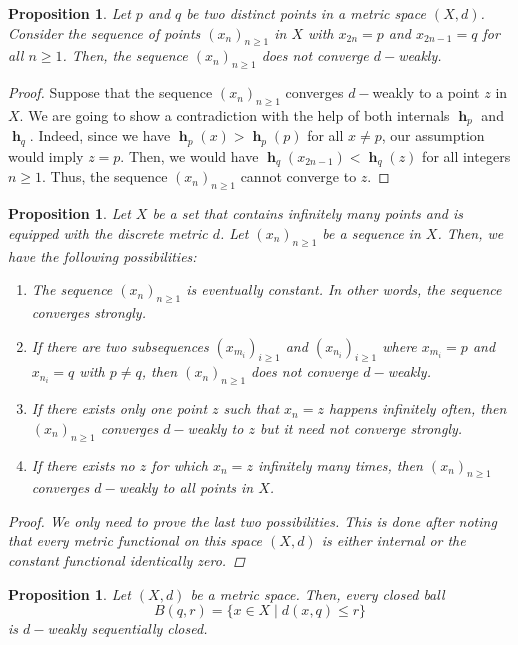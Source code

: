 \documentclass[a4paper,12pt]{article}
\newtheorem{prop}[thm]{Proposition}
\theoremstyle{definition}
\DeclareMathOperator{\h}{\mathbf{h}}
\numberwithin{equation}{section}
\begin{document}
\begin{prop}   
Let $p$ and $q$ be two distinct points in a metric space $(X,d)$. Consider the 
sequence of points $(x_n)_{n\geq 1}$ in $X$ with $x_{2n}=p$ and $x_{2n-1} = q$ 
for all $n\geq 1$. Then, the sequence $(x_n)_{n\geq 1}$ does not converge 
$d-$weakly.
\end{prop}
 
\begin{proof}  
Suppose that the sequence $(x_n)_{n\geq 1}$ converges $d-$weakly to a point $z$ 
in $X$. We are going to show a contradiction with the help of both internals 
$\h_p$ and $\h_q$. Indeed, since we have $\h_p(x) > \h_p(p)$ for all $x\neq p$, 
our assumption would imply $z = p$. Then, we would have $\h_q(x_{2n-1}) < \h_q(z)$ 
for all integers $n\geq 1$. Thus, the sequence $(x_n)_{n\geq 1}$ cannot converge 
to $z$.
\end{proof}
  
\begin{prop}
Let $X$ be a set that contains infinitely many points and is equipped with the 
discrete metric $d$. Let $(x_n)_{n\geq 1}$ be a sequence in $X$. Then, we have 
the following possibilities:
\begin{enumerate}
    \item The sequence $(x_n)_{n\geq 1}$ is eventually constant. In other words, 
    the sequence converges strongly.
    \item If there are two subsequences $(x_{m_i})_{i\geq 1}$ and 
    $(x_{n_i})_{i\geq 1}$ where $x_{m_i}=p$ and $x_{n_i}=q$ 
    with $p \not=q$, then $(x_n)_{n\geq 1}$ does not converge $d-$weakly.
    \item If there exists only one point $z$ such that $x_n=z$ 
    happens infinitely often, then $(x_n)_{n \geq 1}$ converges $d-$weakly 
    to $z$ but it need not converge strongly.
    \item If there exists no $z$ for which $x_n=z$ infinitely many 
    times, then $(x_n)_{n \geq 1}$ converges $d-$weakly to all points in $X$.
\end{enumerate} 

\begin{proof}
We only need to prove the last two possibilities. This is done after noting that 
every metric functional on this space $(X,d)$ is either internal or the constant 
functional identically zero.
\end{proof}
\end{prop}

\begin{prop}
Let $(X,d)$ be a metric space. Then, every closed ball 
$$ B(q, r) = \{x\in X  \mid  d(x,q) \leq r \} $$ 
is $d-$weakly sequentially closed.
\end{prop}
\end{document}
